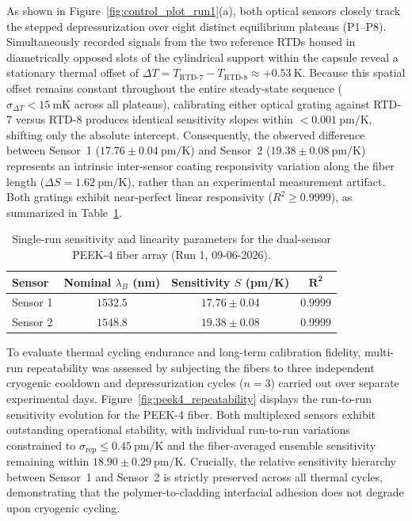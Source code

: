 \documentclass[preprint,11pt]{elsarticle}
\begin{document}
As shown in Figure~\ref{fig:control_plot_run1}(a), both optical sensors closely track the stepped depressurization over eight distinct equilibrium plateaus (P1--P8). Simultaneously recorded signals from the two reference RTDs housed in diametrically opposed slots of the cylindrical support within the capsule reveal a stationary thermal offset of $\Delta T = T_{\text{RTD-7}} - T_{\text{RTD-8}} \approx +0.53~\text{K}$. Because this spatial offset remains constant throughout the entire steady-state sequence ($\sigma_{\Delta T} < 15~\text{mK}$ across all plateaus), calibrating either optical grating against RTD-7 versus RTD-8 produces identical sensitivity slopes within $<0.001~\text{pm/K}$, shifting only the absolute intercept. Consequently, the observed difference between Sensor~1 ($17.76 \pm 0.04~\text{pm/K}$) and Sensor~2 ($19.38 \pm 0.08~\text{pm/K}$) represents an intrinsic inter-sensor coating responsivity variation along the fiber length ($\Delta S = 1.62~\text{pm/K}$), rather than an experimental measurement artifact. Both gratings exhibit near-perfect linear responsivity ($R^2 \ge 0.9999$), as summarized in Table~\ref{tab:peek4_run1_summary}.

\begin{table}[htpb]
    \centering
    \small
    \caption{Single-run sensitivity and linearity parameters for the dual-sensor PEEK-4 fiber array (Run 1, 09-06-2026).}
    \label{tab:peek4_run1_summary}
    \begin{tabular}{lccc}
        \toprule
        \textbf{Sensor} & \textbf{Nominal $\lambda_B$ (nm)} & \textbf{Sensitivity $S$ (pm/K)} & $\boldsymbol{R^2}$ \\
        \midrule
        Sensor 1 & $1532.5$ & $17.76 \pm 0.04$ & 0.9999 \\
        Sensor 2 & $1548.8$ & $19.38 \pm 0.08$ & 0.9999 \\
        \bottomrule
    \end{tabular}
\end{table}

To evaluate thermal cycling endurance and long-term calibration fidelity, multi-run repeatability was assessed by subjecting the fibers to three independent cryogenic cooldown and depressurization cycles ($n = 3$) carried out over separate experimental days. Figure~\ref{fig:peek4_repeatability} displays the run-to-run sensitivity evolution for the PEEK-4 fiber. Both multiplexed sensors exhibit outstanding operational stability, with individual run-to-run variations constrained to $\sigma_{\text{rep}} \le 0.45~\text{pm/K}$ and the fiber-averaged ensemble sensitivity remaining within $18.90 \pm 0.29~\text{pm/K}$. Crucially, the relative sensitivity hierarchy between Sensor~1 and Sensor~2 is strictly preserved across all thermal cycles, demonstrating that the polymer-to-cladding interfacial adhesion does not degrade upon cryogenic cycling.
\end{document}
